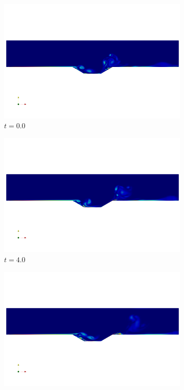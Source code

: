\begin{figure}
\begin{center}
\begin{subfigure}[t]{0.49\textwidth}
\includegraphics[trim={18cm 16cm 18cm 15cm},clip,width=1.0\linewidth]{figs/cavity/animate/sol0000.png}
\caption{$t=0.0$}
\end{subfigure}
\begin{subfigure}[t]{0.49\textwidth}
\includegraphics[trim={18cm 16cm 18cm 15cm},clip,width=1.0\linewidth]{figs/cavity/animate/sol0040.png}
\caption{$t=4.0$}
\end{subfigure}
\begin{subfigure}[t]{0.49\textwidth}
\includegraphics[trim={18cm 16cm 18cm 15cm},clip,width=1.0\linewidth]{figs/cavity/animate/sol0080.png}

\end{subfigure}
\end{center}
\end{figure}
